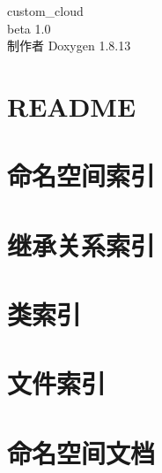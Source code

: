 \documentclass[twoside]{book}
\newcommand{\+}{\discretionary{\mbox{\scriptsize$\hookleftarrow$}}{}{}}
\newcommand{\clearemptydoublepage}{%
  \newpage{\pagestyle{empty}\cleardoublepage}%
}
\begin{document}
\begin{titlepage}
\vspace*{7cm}
\begin{center}%
{\Large custom\+\_\+cloud \\[1ex]\large beta 1.\+0 }\\
\vspace*{1cm}
{\large 制作者 Doxygen 1.8.13}\\
\end{center}
\end{titlepage}
\clearemptydoublepage
{}
\tableofcontents
\clearemptydoublepage
{}

\chapter{R\+E\+A\+D\+ME}
\label{md_README}

\chapter{命名空间索引}

\chapter{继承关系索引}

\chapter{类索引}

\chapter{文件索引}

\chapter{命名空间文档}












\end{document}
